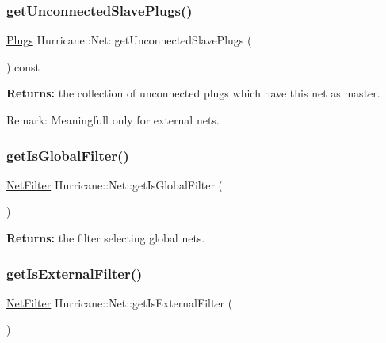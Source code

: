 \subsubsection{\texorpdfstring{get\+Unconnected\+Slave\+Plugs()}{getUnconnectedSlavePlugs()}}
{\footnotesize\ttfamily \mbox{\hyperlink{namespaceHurricane_ac8335d2057483ee7a935c15a9460c64f}{Plugs}} Hurricane\+::\+Net\+::get\+Unconnected\+Slave\+Plugs (\begin{DoxyParamCaption}{ }\end{DoxyParamCaption}) const}

{\bfseries Returns\+:} the collection of unconnected plugs which have this net as master.

\begin{DoxyParagraph}{Remark\+: Meaningfull only for external nets. }

\end{DoxyParagraph}
\mbox{\label{classHurricane_1_1Net_a1730ed1247cd9bce7fcf519ea60dc738}} 
\subsubsection{\texorpdfstring{get\+Is\+Global\+Filter()}{getIsGlobalFilter()}}
{\footnotesize\ttfamily \mbox{\hyperlink{namespaceHurricane_a0dfd2c5b40325a919d139091312732e9}{Net\+Filter}} Hurricane\+::\+Net\+::get\+Is\+Global\+Filter (\begin{DoxyParamCaption}{ }\end{DoxyParamCaption})\hspace{0.3cm}{\ttfamily [static]}}

{\bfseries Returns\+:} the filter selecting global nets. \mbox{\label{classHurricane_1_1Net_a3af91a80e219e37e70229e61dfd385da}} 
\subsubsection{\texorpdfstring{get\+Is\+External\+Filter()}{getIsExternalFilter()}}
{\footnotesize\ttfamily \mbox{\hyperlink{namespaceHurricane_a0dfd2c5b40325a919d139091312732e9}{Net\+Filter}} Hurricane\+::\+Net\+::get\+Is\+External\+Filter (\begin{DoxyParamCaption}{ }\end{DoxyParamCaption})\hspace{0.3cm}{\ttfamily [static]}}

